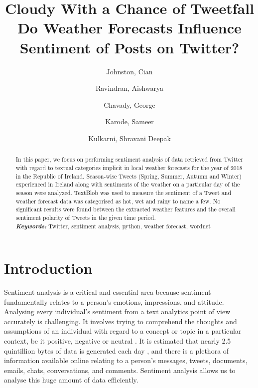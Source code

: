 \documentclass[a4paper,10pt]{article}
\begin{document}
    \title{Cloudy With a Chance of Tweetfall \\ \large{Do Weather Forecasts Influence Sentiment of Posts on Twitter?}}
    \author{
        Johnston, Cian
        \and
        Ravindran, Aishwarya
        \and
        Chavady, George
        \and
        Karode, Sameer
        \and
        Kulkarni, Shravani Deepak
    }

    \maketitle

    \begin{abstract}
     In this paper, we focus on performing sentiment analysis of data retrieved from Twitter with regard to textual categories implicit in local weather forecasts for the year of 2018 in the Republic of Ireland. Season-wise Tweets (Spring, Summer, Autumn and Winter) experienced in Ireland along with sentiments of the weather on a particular day of the season were analyzed. TextBlob was used to measure the sentiment of a Tweet and weather forecast data was categorised as hot, wet and rainy to name a few. No significant results were found between the extracted weather features and the overall sentiment polarity of Tweets in the given time period.
    \\
    \textbf{\textit{Keywords:}} Twitter, sentiment analysis, python, weather forecast, wordnet
    \end{abstract}

    \section{Introduction}

    Sentiment analysis is a critical and essential area because sentiment fundamentally relates to a person’s emotions, impressions, and attitude. Analysing every individual’s sentiment from a text analytics point of view accurately is challenging. It involves trying to comprehend the thoughts and assumptions of an individual with regard to a concept or topic in a particular context, be it positive, negative or neutral . It is estimated that nearly 2.5 quintillion bytes of data is generated each day , and there is a plethora of information available online relating to a person’s messages, tweets, documents, emails, chats, conversations, and comments. Sentiment analysis allows us to analyse this huge amount of data efficiently.
\end{document}
